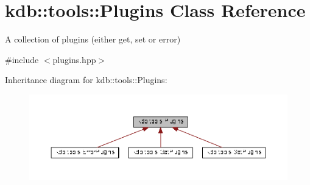 \hypertarget{classkdb_1_1tools_1_1Plugins}{\section{kdb\+:\+:tools\+:\+:Plugins Class Reference}
\label{classkdb_1_1tools_1_1Plugins}
}


A collection of plugins (either get, set or error)  




{\ttfamily \#include $<$plugins.\+hpp$>$}



Inheritance diagram for kdb\+:\+:tools\+:\+:Plugins\+:
\nopagebreak
\begin{figure}[H]
\begin{center}
\leavevmode
\includegraphics[width=350pt]{classkdb_1_1tools_1_1Plugins__inherit__graph}
\end{center}
\end{figure}

